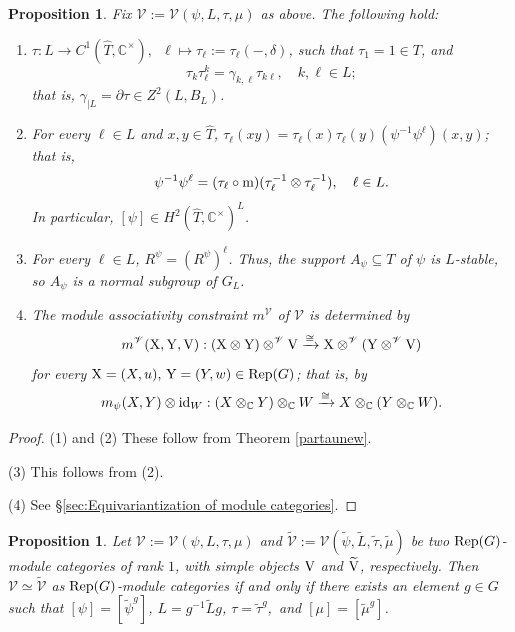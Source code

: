 \documentclass{amsart}
\newtheorem{proposition}[theorem]{Proposition}
\theoremstyle{definition}
\newcommand{\id}{{\rm id}}
\newcommand{\Rep}{{\rm Rep}}
\newcommand{\V}{\mathscr{V}}
\newcommand{\ot}{\otimes}
\numberwithin{equation}{section}
\begin{document}
\begin{proposition}\label{newcofib}
Fix $\V:=\V(\psi,L,\tau,\mu)$ as above. The following hold:
\begin{enumerate} 
\item
$\tau: L\to C^1(\widehat{T},\mathbb{C}^{\times}),\,\,\,\ell\mapsto \tau_{\ell}:=\tau_{\ell}(-,\delta)$,
such that $\tau_{1}=1\in T$, and  
$$\tau_{k}\tau_{\ell}^k=\gamma_{k,\ell}\tau_{k\ell},\quad k,\ell\in L;$$
that is, 
$\gamma_{\mid L}=\partial\tau\in Z^2(L,B_L)$.
\item
For every $\ell\in L$ and $x,y\in \widehat{T}$, $\tau_{\ell}(xy)=\tau_{\ell}(x)\tau_{\ell}(y)(\psi^{-1}\psi^{\ell})(x,y)$; that is, 
$$\psi^{-1}\psi^{\ell}=(\tau_{\ell}\circ {\rm m})(\tau_{\ell}^{-1}\ot \tau_{\ell}^{-1}),\quad \ell\in L.$$ 
In particular, 
$[\psi]\in H^2(\widehat{T},\mathbb{C}^{\times})^L$.
\item
For every $\ell\in L$, $R^{\psi}=(R^{\psi})^{\ell}$. Thus, the support $A_{\psi}\subseteq T$ of $\psi$ is $L$-stable, so $A_{\psi}$ is a normal subgroup of $G_L$. 
\item
The module associativity constraint $m^{\V}$ of $\V$ is determined by 
\begin{equation*}
m^{\V}({\rm X},{\rm Y},{\rm V}):({\rm X}\ot {\rm Y})\ot^{\V} {\rm V}\xrightarrow{\cong}{\rm X}\ot^{\V} ({\rm Y}\ot^{\V} {\rm V})
\end{equation*}
for every ${\rm X}=(X,u),\,{\rm Y}=(Y,w)\in \Rep(G)$; that is, by
$$m_{\psi}(X,Y)\ot \id_{W}:(X\ot_{\mathbb{C}} Y)\ot_{\mathbb{C}} W\xrightarrow{\cong}X\ot_{\mathbb{C}} (Y\ot_{\mathbb{C}} W).$$
\end{enumerate}
\end{proposition}

\begin{proof}
(1) and (2) These follow from Theorem \ref{partaunew}.

(3) This follows from (2).

(4) See \S\ref{sec:Equivariantization of module categories}.
\end{proof}

\begin{proposition}\label{equivclasses}
Let $\V:=\V(\psi,L,\tau,\mu)$ and $\widetilde{\V}:=\V(\widetilde{\psi},\widetilde{L},\widetilde{\tau},\widetilde{\mu})$ be two $\Rep(G)$-module categories of rank $1$, with simple objects ${\rm V}$ and $\widetilde{{\rm V}}$, respectively. Then 
$\V\simeq\widetilde{\V}$ as $\Rep(G)$-module categories if and only if there exists an element $g\in G$ such that
$[\psi]=[\widetilde{\psi}^g]$, $L=g^{-1}\widetilde{L}g$, $\tau=\widetilde{\tau}^g$,\ and $[\mu]=[\widetilde{\mu}^g]$.
\end{proposition}
\end{document}
